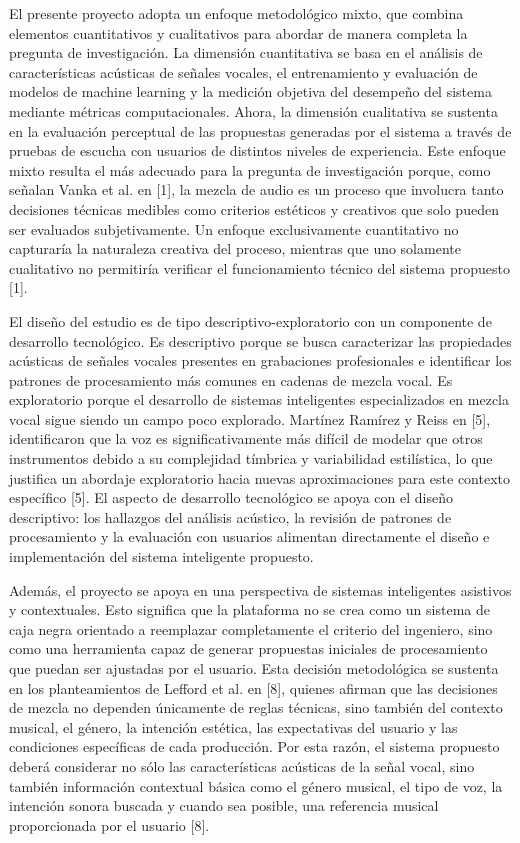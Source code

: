 El presente proyecto adopta un enfoque metodológico mixto, que combina elementos cuantitativos y cualitativos para abordar de manera completa la pregunta de investigación. La dimensión cuantitativa se basa en el análisis de características acústicas de señales vocales, el entrenamiento y evaluación de modelos de machine learning y la medición objetiva del desempeño del sistema mediante métricas computacionales. Ahora, la dimensión cualitativa se sustenta en la evaluación perceptual de las propuestas generadas por el sistema a través de pruebas de escucha con usuarios de distintos niveles de experiencia. Este enfoque mixto resulta el más adecuado para la pregunta de investigación porque, como señalan Vanka et al. en [1], la mezcla de audio es un proceso que involucra tanto decisiones técnicas medibles como criterios estéticos y creativos que solo pueden ser evaluados subjetivamente. Un enfoque exclusivamente cuantitativo no capturaría la naturaleza creativa del proceso, mientras que uno solamente cualitativo no permitiría verificar el funcionamiento técnico del sistema propuesto [1].

El diseño del estudio es de tipo descriptivo-exploratorio con un componente de desarrollo tecnológico. Es descriptivo porque se busca caracterizar las propiedades acústicas de señales vocales presentes en grabaciones profesionales e identificar los patrones de procesamiento más comunes en cadenas de mezcla vocal. Es exploratorio porque el desarrollo de sistemas inteligentes especializados en mezcla vocal sigue siendo un campo poco explorado. Martínez Ramírez y Reiss en [5], identificaron que la voz es significativamente más difícil de modelar que otros instrumentos debido a su complejidad tímbrica y variabilidad estilística, lo que justifica un abordaje exploratorio hacia nuevas aproximaciones para este contexto específico [5]. El aspecto de desarrollo tecnológico se apoya con el diseño descriptivo: los hallazgos del análisis acústico, la revisión de patrones de procesamiento y la evaluación con usuarios alimentan directamente el diseño e implementación del sistema inteligente propuesto.

Además, el proyecto se apoya en una perspectiva de sistemas inteligentes asistivos y contextuales. Esto significa que la plataforma no se crea como un sistema de caja negra orientado a reemplazar completamente el criterio del ingeniero, sino como una herramienta capaz de generar propuestas iniciales de procesamiento que puedan ser ajustadas por el usuario. Esta decisión metodológica se sustenta en los planteamientos de Lefford et al. en [8], quienes afirman que las decisiones de mezcla no dependen únicamente de reglas técnicas, sino también del contexto musical, el género, la intención estética, las expectativas del usuario y las condiciones específicas de cada producción. Por esta razón, el sistema propuesto deberá considerar no sólo las características acústicas de la señal vocal, sino también información contextual básica como el género musical, el tipo de voz, la intención sonora buscada y cuando sea posible, una referencia musical proporcionada por el usuario [8].

